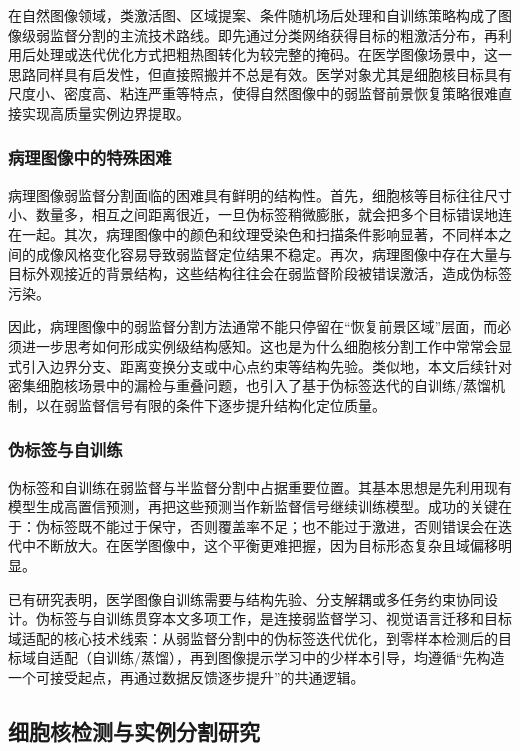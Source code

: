 在自然图像领域，类激活图、区域提案、条件随机场后处理和自训练策略构成了图像级弱监督分割的主流技术路线。即先通过分类网络获得目标的粗激活分布，再利用后处理或迭代优化方式把粗热图转化为较完整的掩码。在医学图像场景中，这一思路同样具有启发性，但直接照搬并不总是有效。医学对象尤其是细胞核目标具有尺度小、密度高、粘连严重等特点，使得自然图像中的弱监督前景恢复策略很难直接实现高质量实例边界提取。

\subsubsection{病理图像中的特殊困难}
病理图像弱监督分割面临的困难具有鲜明的结构性。首先，细胞核等目标往往尺寸小、数量多，相互之间距离很近，一旦伪标签稍微膨胀，就会把多个目标错误地连在一起。其次，病理图像中的颜色和纹理受染色和扫描条件影响显著，不同样本之间的成像风格变化容易导致弱监督定位结果不稳定。再次，病理图像中存在大量与目标外观接近的背景结构，这些结构往往会在弱监督阶段被错误激活，造成伪标签污染。

因此，病理图像中的弱监督分割方法通常不能只停留在“恢复前景区域”层面，而必须进一步思考如何形成实例级结构感知。这也是为什么细胞核分割工作中常常会显式引入边界分支、距离变换分支或中心点约束等结构先验。类似地，本文后续针对密集细胞核场景中的漏检与重叠问题，也引入了基于伪标签迭代的自训练/蒸馏机制，以在弱监督信号有限的条件下逐步提升结构化定位质量。

\subsubsection{伪标签与自训练}
伪标签和自训练在弱监督与半监督分割中占据重要位置。其基本思想是先利用现有模型生成高置信预测，再把这些预测当作新监督信号继续训练模型。成功的关键在于：伪标签既不能过于保守，否则覆盖率不足；也不能过于激进，否则错误会在迭代中不断放大。在医学图像中，这个平衡更难把握，因为目标形态复杂且域偏移明显。

已有研究表明，医学图像自训练需要与结构先验、分支解耦或多任务约束协同设计。伪标签与自训练贯穿本文多项工作，是连接弱监督学习、视觉语言迁移和目标域适配的核心技术线索：从弱监督分割中的伪标签迭代优化，到零样本检测后的目标域自适配（自训练/蒸馏），再到图像提示学习中的少样本引导，均遵循“先构造一个可接受起点，再通过数据反馈逐步提升”的共通逻辑。

\subsection{细胞核检测与实例分割研究}
